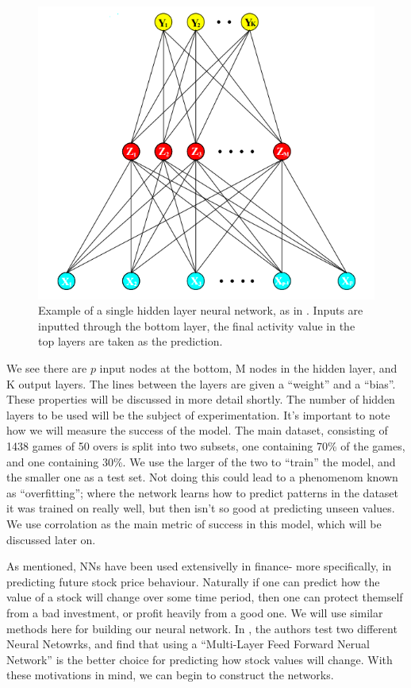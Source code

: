 \begin{figure}
    \centering
    \includegraphics[scale=0.5]{figures/nn.png}
    \caption{Example of a single hidden layer neural network, as in \cite{sprbk}. Inputs are inputted through the bottom layer, the final activity value in the top
    layers are taken as the prediction.}
    \label{nnexample1}
\end{figure}

We see there are $p$ input nodes at the bottom, M nodes in the hidden layer, and K output layers. The lines between the layers are given a ``weight''
and a ``bias''. These properties will be discussed in more detail shortly. The number of hidden layers to be used will be the subject of experimentation. 
It's important to note how we will measure the success of the model. The main dataset, consisting of 1438 games of 50 overs is split into two subsets, one 
containing 70\% of the games, and one containing 30\%. We use the larger of the two to ``train'' the model, and the smaller one as a test set. Not doing this could 
lead to a phenomenom known as ``overfitting''; where the network learns how to predict patterns in the dataset it was trained on really well, but then isn't so good 
at predicting unseen values. We use corrolation as the main metric of success in this model, which will be discussed later on.

As mentioned, NNs have been used extensivelly in finance- more specifically, in predicting future stock price behaviour. Naturally if one can predict how the value of a stock
will change over some time period, then one can protect themself from a bad investment, or profit heavily from a good one. We will use similar
methods here for building our neural network.  In \cite{nnstock}, the authors test two different Neural Netowrks, and find that using a ``Multi-Layer Feed Forward Nerual Network''
is the better choice for predicting how stock values will change. With these motivations in mind, we can begin to construct the networks.

